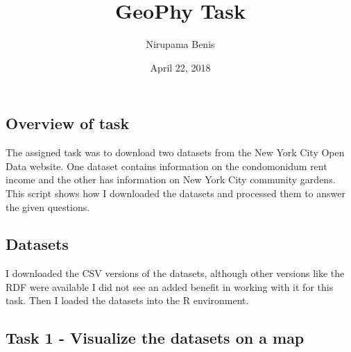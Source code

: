 \documentclass[]{article}
\title{GeoPhy Task}
\author{Nirupama Benis}
\date{April 22, 2018}
\newenvironment{Shaded}{\begin{snugshade}}{\end{snugshade}}
\newcommand{\KeywordTok}[1]{\textcolor[rgb]{0.13,0.29,0.53}{\textbf{#1}}}
\newcommand{\DataTypeTok}[1]{\textcolor[rgb]{0.13,0.29,0.53}{#1}}
\newcommand{\StringTok}[1]{\textcolor[rgb]{0.31,0.60,0.02}{#1}}
\newcommand{\OperatorTok}[1]{\textcolor[rgb]{0.81,0.36,0.00}{\textbf{#1}}}
\newcommand{\NormalTok}[1]{#1}
\begin{document}
\maketitle

\subsection{Overview of task}\label{overview-of-task}

The assigned task was to download two datasets from the New York City
Open Data website. One dataset contains information on the condomonidum
rent income and the other has information on New York City community
gardens. This script shows how I downloaded the datasets and processed
them to answer the given questions.

\subsection{Datasets}\label{datasets}

I downloaded the CSV versions of the datasets, although other versions
like the RDF were available I did not see an added benefit in working
with it for this task. Then I loaded the datasets into the R
environment.

\begin{Shaded}
\end{Shaded}

\subsection{Task 1 - Visualize the datasets on a
map}\label{task-1---visualize-the-datasets-on-a-map}
\end{document}
